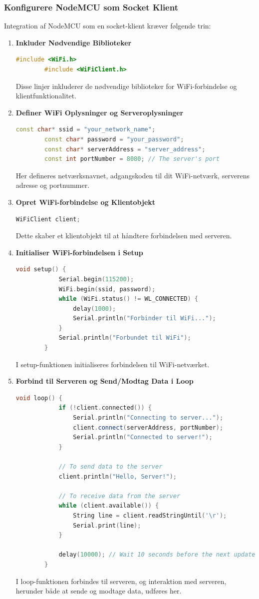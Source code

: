 \subsubsection*{Konfigurere NodeMCU som Socket Klient}
Integration af NodeMCU som en socket-klient kræver følgende trin:

\begin{enumerate}
	\item \textbf{Inkluder Nødvendige Biblioteker}
	\begin{lstlisting}[language=C++, caption=Syntaks]
		#include <WiFi.h>
		#include <WiFiClient.h>
	\end{lstlisting}
	Disse linjer inkluderer de nødvendige biblioteker for WiFi-forbindelse og klientfunktionalitet.
	
	\item \textbf{Definer WiFi Oplysninger og Serveroplysninger}
	\begin{lstlisting}[language=C++, caption=Syntaks]
		const char* ssid = "your_network_name";
		const char* password = "your_password";
		const char* serverAddress = "server_address";
		const int portNumber = 8080; // The server's port
	\end{lstlisting}
	Her defineres netværksnavnet, adgangskoden til dit WiFi-netværk, serverens adresse og portnummer.
	
	\item \textbf{Opret WiFi-forbindelse og Klientobjekt}
	\begin{lstlisting}[language=C++, caption=Syntaks]
		WiFiClient client;
	\end{lstlisting}
	Dette skaber et klientobjekt til at håndtere forbindelsen med serveren.
	
	\item \textbf{Initialiser WiFi-forbindelsen i Setup}
	\begin{lstlisting}[language=C++, caption=Syntaks]
		void setup() {
			Serial.begin(115200);
			WiFi.begin(ssid, password);
			while (WiFi.status() != WL_CONNECTED) {
				delay(1000);
				Serial.println("Forbinder til WiFi...");
			}
			Serial.println("Forbundet til WiFi");
		}
	\end{lstlisting}
	I setup-funktionen initialiseres forbindelsen til WiFi-netværket.
	
	\item \textbf{Forbind til Serveren og Send/Modtag Data i Loop}
	\begin{lstlisting}[language=C++, caption=Syntaks]
		void loop() {
			if (!client.connected()) {
				Serial.println("Connecting to server...");
				client.connect(serverAddress, portNumber);
				Serial.println("Connected to server!");
			}
			
			// To send data to the server
			client.println("Hello, Server!");
			
			// To receive data from the server
			while (client.available()) {
				String line = client.readStringUntil('\r');
				Serial.print(line);
			}
			
			delay(10000); // Wait 10 seconds before the next update
		}
	\end{lstlisting}
	I loop-funktionen forbindes til serveren, og interaktion med serveren, herunder både at sende og modtage data, udføres her.
\end{enumerate}
